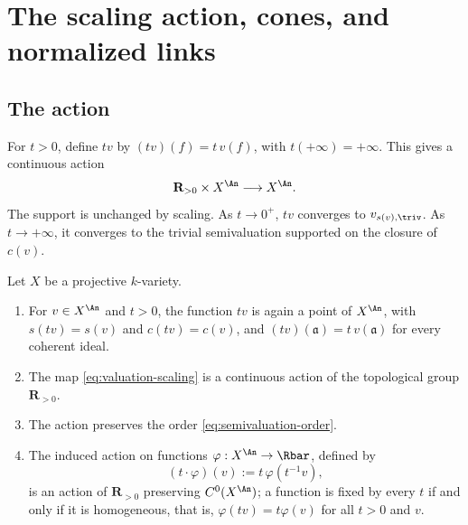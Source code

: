 \section{The scaling action, cones, and normalized links}
\label{sec:ch32-scaling}

\subsection{The action}
\label{sec:ch32-action}

For $t>0$, define $tv$ by $(tv)(f)=t\,v(f)$, with
$t(+\infty)=+\infty$.  This gives a continuous action
\begin{equation}
\label{eq:valuation-scaling}
              \mathbf R_{>0}\times X^{\An}\longrightarrow X^{\An}.
\end{equation}
The support is unchanged by scaling.  As $t\to0^+$, $tv$ converges to
$v_{s(v),\triv}$.  As $t\to+\infty$, it converges to the trivial
semivaluation supported on the closure of $c(v)$.

\begin{proposition}
\label{prop:ch32-scaling-action}
Let $X$ be a projective $k$-variety.
\begin{enumerate}
\item\label{itm:ch32-sa:point}
For $v\in X^{\An}$ and $t>0$, the function $tv$ is again a point of
$X^{\An}$, with $s(tv)=s(v)$ and $c(tv)=c(v)$, and
$(tv)(\mathfrak a)=t\,v(\mathfrak a)$ for every coherent ideal.
\item\label{itm:ch32-sa:cont}
The map \eqref{eq:valuation-scaling} is a continuous action of the
topological group $\mathbf R_{>0}$.
\item\label{itm:ch32-sa:order}
The action preserves the order \eqref{eq:semivaluation-order}.
\item\label{itm:ch32-sa:functions}
The induced action on functions $\varphi:X^{\An}\to\Rbar$, defined by
\begin{equation}
\label{eq:ch32-scaling-on-functions}
 (t\cdot\varphi)(v):=t\,\varphi(t^{-1}v),
\end{equation}
is an action of $\mathbf R_{>0}$ preserving $C^0(X^{\An})$; a function is
fixed by every $t$ if and only if it is homogeneous, that is,
$\varphi(tv)=t\varphi(v)$ for all $t>0$ and $v$.
\end{enumerate}
\end{proposition}


